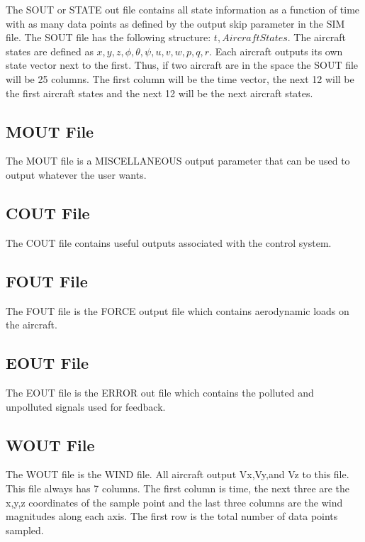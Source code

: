 \documentclass[letterpaper]{article}
\begin{document}
The SOUT or STATE out file contains all state information as a
function of time with as many data points as defined by the output
skip parameter in the SIM file. The SOUT file has the following
structure: $t,Aircraft States$. The
aircraft states are defined as
$x,y,z,\phi,\theta,\psi,u,v,w,p,q,r$. Each aircraft outputs its own
state vector next to the first. Thus, if two aircraft are in the space
the SOUT file will be 25 columns. The first column will be the time
vector, the next 12 will be the first aircraft states and the next 12
will be the next aircraft states.

\subsection{MOUT File}

The MOUT file is a MISCELLANEOUS output parameter that can be used to
output whatever the user wants. 

\subsection{COUT File}

The COUT file contains useful outputs associated with the control
system. 

\subsection{FOUT File}

The FOUT file is the FORCE output file which contains aerodynamic
loads on the aircraft.

\subsection{EOUT File}

The EOUT file is the ERROR out file which contains the polluted and
unpolluted signals used for feedback.

\subsection{WOUT File}

The WOUT file is the WIND file. All aircraft output Vx,Vy,and Vz to
this file. This file always has 7 columns. The first column is time,
the next three are the x,y,z coordinates of the sample point and the
last three columns are the wind magnitudes along each axis. The first
row is the total number of data points sampled.
\end{document}
